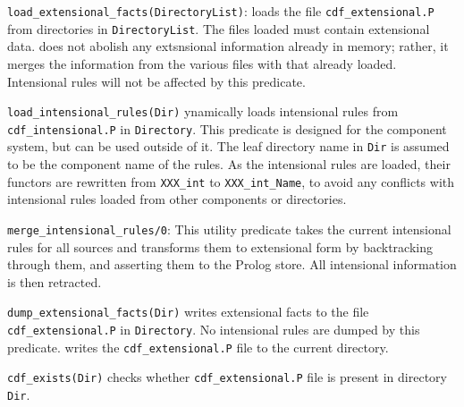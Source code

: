\begin{description}	
{\tt load\_extensional\_facts(DirectoryList)}: loads the file
{\tt cdf\_extensional.P} from directories in {\tt DirectoryList}.  The
files loaded must contain extensional data.
 does not abolish any extsnsional
information already in memory; rather, it merges the information from
the various files with that already loaded.  Intensional rules will
not be affected by this predicate.  

{\tt load\_intensional\_rules(Dir)} ynamically loads intensional rules
from {\tt cdf\_intensional.P} in {\tt Directory}.  This predicate is
designed for the component system, but can be used outside of it.  The
leaf directory name in {\tt Dir} is assumed to be the component name
of the rules.  As the intensional rules are loaded, their functors are
rewritten from {\tt XXX\_int} to {\tt XXX\_int\_Name}, to avoid any
conflicts with intensional rules loaded from other components or
directories.

{\tt merge\_intensional\_rules/0}: This utility predicate takes the
current intensional rules for all sources and transforms them to
extensional form by backtracking through them, and asserting them to
the Prolog store.  All intensional information is then retracted.

{\tt dump\_extensional\_facts(Dir)} writes extensional facts to the
file {\tt cdf\_extensional.P} in {\tt Directory}.  No intensional
rules are dumped by this predicate.
 writes the {\tt cdf\_extensional.P} file
to the current directory. 


{\tt cdf\_exists(Dir)} checks whether {\tt cdf\_extensional.P} file is
present in directory {\tt Dir}.

\end{description}
